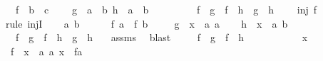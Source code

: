 \begin{isabellebody}
\ \ \ f\ {\isacharcolon}{\isacharcolon}\ {\isachardoublequoteopen}{\isacharprime}b\ {\isasymRightarrow}\ {\isacharprime}c{\isachardoublequoteclose}\ \isanewline
\ \ \ {\isachardoublequoteopen}{\isasymforall}{\isacharparenleft}g\ {\isacharcolon}{\isacharcolon}\ {\isacharprime}a\ {\isasymRightarrow}\ {\isacharprime}b{\isacharparenright}\ {\isacharparenleft}h\ {\isacharcolon}{\isacharcolon}\ {\isacharprime}a\ {\isasymRightarrow}\ {\isacharprime}b{\isacharparenright}{\isachardot}\isanewline
\ \ \ \ \ \ \ \ \ {\isacharparenleft}f\ {\isasymcirc}\ g\ {\isacharequal}\ f\ {\isasymcirc}\ h\ {\isasymlongrightarrow}\ g\ {\isacharequal}\ h{\isacharparenright}{\isachardoublequoteclose}\isanewline
\ \ \ {\isachardoublequoteopen}\ inj\ f{\isachardoublequoteclose}\isanewline
%
\isadelimproof
%
\endisadelimproof
%
\isatagproof
{}\isamarkupfalse%
\ {\isacharparenleft}rule\ injI{\isacharparenright}\isanewline
\ \ \isamarkupfalse%
\ a\ b\ \isanewline
\ \ \isamarkupfalse%
\ {}{\isacharcolon}\ {\isachardoublequoteopen}f\ a\ {\isacharequal}\ f\ b\ {\isachardoublequoteclose}\isanewline
\ \ \isamarkupfalse%
\ {\isacharquery}g\ {\isacharequal}\ {\isachardoublequoteopen}{\isasymlambda}x\ {\isacharcolon}{\isacharcolon}\ {\isacharprime}a{\isachardot}\ a{\isachardoublequoteclose}\isanewline
\ \ \isamarkupfalse%
\ {\isacharquery}h\ {\isacharequal}\ {\isachardoublequoteopen}{\isasymlambda}x\ {\isacharcolon}{\isacharcolon}\ {\isacharprime}a{\isachardot}\ b{\isachardoublequoteclose}\isanewline
\ \ \isamarkupfalse%
\ {}{\isacharcolon}\ {\isachardoublequoteopen}\ {\isacharparenleft}f\ {\isasymcirc}\ {\isacharquery}g\ {\isacharequal}\ f\ {\isasymcirc}\ {\isacharquery}h\ {\isasymlongrightarrow}\ {\isacharquery}g\ {\isacharequal}\ {\isacharquery}h{\isacharparenright}{\isachardoublequoteclose}\ \ \isamarkupfalse%
\ assms\ \isamarkupfalse%
\ blast\isanewline
\ \ \isamarkupfalse%
\ {}{\isacharcolon}\ {\isachardoublequoteopen}f\ {\isasymcirc}\ {\isacharquery}g\ {\isacharequal}\ f\ {\isasymcirc}\ {\isacharquery}h{\isachardoublequoteclose}\ \isanewline
\ \ \isamarkupfalse%
\ \isanewline
\ \ \ \ \isamarkupfalse%
\ x\isanewline
\ \ \ \ \isamarkupfalse%
\ {\isachardoublequoteopen}\ {\isacharparenleft}f\ {\isasymcirc}\ {\isacharparenleft}{\isasymlambda}x\ {\isacharcolon}{\isacharcolon}\ {\isacharprime}a{\isachardot}\ a{\isacharparenright}{\isacharparenright}\ x\ {\isacharequal}\ f{\isacharparenleft}a{\isacharparenright}\ {\isachardoublequoteclose}\ \isamarkupfalse%

\end{isabellebody}
